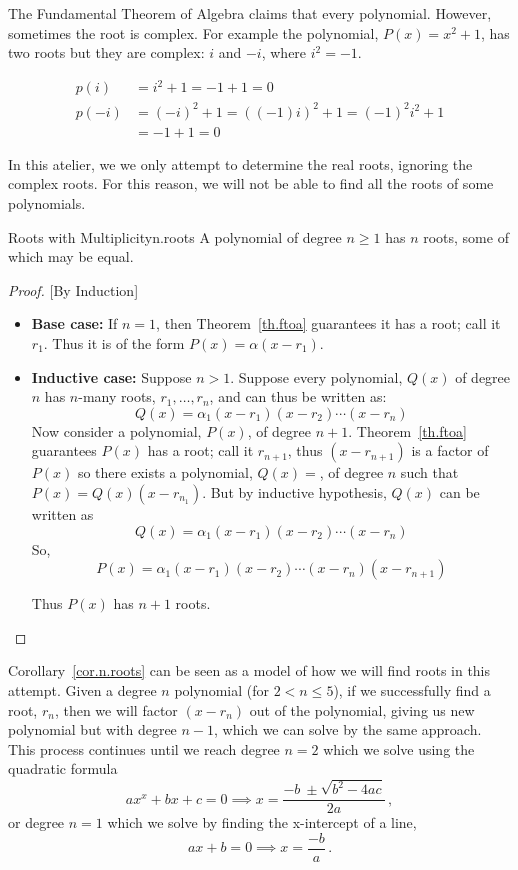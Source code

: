 The Fundamental Theorem of Algebra claims that every polynomial.  However, sometimes the root is complex.
For example the polynomial, $P(x) = x^2 + 1$, has two roots but they are complex: $i$ and $-i$, where $i^2= -1$.

\begin{align*}
  p(i) &= i^2 + 1 = -1 + 1 = 0\\[3pt]
  p(-i) &= (-i)^2 + 1 = ((-1)i)^2 + 1 = (-1)^2i^2 + 1 \\
  &= -1 + 1 = 0
\end{align*}

In this atelier, we we only attempt to determine the real roots, ignoring the complex roots.
For this reason, we will not be able to find all the roots of some polynomials.

\begin{corollary}{Roots with Multiplicity}{n.roots}
  A polynomial of degree $n\ge 1$ has $n$ roots, some of which may be equal.
\end{corollary}
\begin{proof}

  [By Induction]
  
  \begin{itemize}
    
  \item \textbf{Base case:} If $n=1$, then Theorem~\ref{th.ftoa}
    guarantees it has a root; call it $r_1$.  Thus it is of the form
    $P(x)=\alpha (x-r_1)$.
  \item \textbf{Inductive case:} Suppose $n>1$.  Suppose every polynomial, $Q(x)$ of degree
    $n$ has $n$-many roots, $r_1,\ldots,r_n$, and can thus be written as:
    \[Q(x) = \alpha_1 (x - r_1) (x - r_2) \cdots (x - r_n)\]
    Now consider a polynomial, $P(x)$, of
    degree $n+1$.  Theorem~\ref{th.ftoa} guarantees $P(x)$ has a root;
    call it $r_{n+1}$, thus $(x-r_{n+1})$ is a factor of $P(x)$ so there
    exists a polynomial, $Q(x)=$, of degree $n$ such that
    $P(x) =  Q(x) (x-r_{n_1})$.
    But by inductive hypothesis, $Q(x)$ can be written
    as \[Q(x) = \alpha_1 (x - r_1) (x - r_2) \cdots (x - r_n)\]
    So, \[P(x) = \alpha_1 (x - r_1) (x - r_2) \cdots (x - r_n) (x-r_{n+1})\]

    Thus $P(x)$ has $n+1$ roots.
  \end{itemize}
\end{proof}

Corollary~\ref{cor.n.roots} can be seen as a model of how we will find
roots in this attempt.  Given a degree $n$ polynomial (for $2<n\leq
5$), if we successfully find a root, $r_n$, then we will factor
$(x-r_n)$ out of the polynomial, giving us new polynomial but with
degree $n-1$, which we can solve by the same approach.  This process
continues until we reach degree $n=2$ which we solve using the
quadratic formula
\[ a x^x + b x + c = 0 \implies x = \frac{-b~ \pm \sqrt{b^2 - 4a c}}{2a}\,,\] or
degree $n=1$ which we solve by finding the x-intercept of a line,
\[ a x + b = 0 \implies x=\frac{-b}{a}\,.\]

